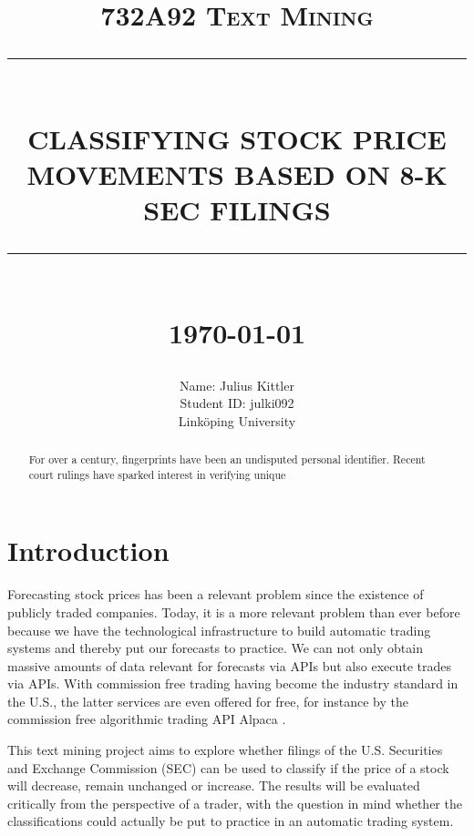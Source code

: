 \documentclass{article}
\newcommand{\HRule}[1]{\rule{\linewidth}{#1}}
\begin{document}
	
	\title{\textsc{732A92 Text Mining} \\ [2.0cm]
		\HRule{0.5pt} \\
		\LARGE \textbf{\uppercase{Classifying Stock Price Movements based on 8-K SEC filings}}
		\HRule{2pt} \\ [0.5cm]
		\normalsize \today \vspace*{5\baselineskip}}
	
	\date{}
	
	\author{
		Name: Julius Kittler \\ 
		Student ID: julki092 \\ 
		Link\"{o}ping University}
	
	\maketitle
	\newpage
	
	\begin{abstract}
		
		For over a century, fingerprints have been an undisputed
		personal identifier.  Recent court rulings have sparked
		interest in verifying unique
	\end{abstract}

	\newpage
	\tableofcontents
	\newpage
	\listoffigures
	\listoftables
	\newpage

	\section{Introduction}
	
	Forecasting stock prices has been a relevant problem since the existence of publicly traded companies. Today, it is a more relevant problem than ever before because we have the technological infrastructure to build automatic trading systems and thereby put our forecasts to practice. We can not only obtain massive amounts of data relevant for forecasts via APIs but also execute trades via APIs. With commission free trading having become the industry standard in the U.S., the latter services are even offered for free, for instance by the commission free algorithmic trading API Alpaca \cite{noauthor_alpaca_nodate}. 
	
	This text mining project aims to explore whether filings of the U.S. Securities and Exchange Commission (SEC) can be used to classify if the price of a stock will decrease, remain unchanged or increase. The results will be evaluated critically from the perspective of a trader, with the question in mind whether the classifications could actually be put to practice in an automatic trading system.
	
\end{document}
